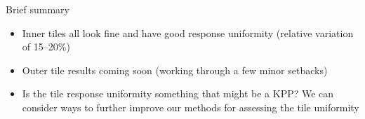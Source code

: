 \documentclass[compress,8pt]{beamer} %
\begin{document}
\iffalse

\begin{frame}
Outer HCal tiles
\end{frame}

\begin{frame}{Outer HCal Tile Scan---945}
\begin{adjustwidth}{-3em}{-3em}
\begin{center}
\texttt{[image: ./Photos/FarEtaOuterHCalScanBrokenFiber.png]}
\end{center}
\end{adjustwidth}
Known bad tile... was this intentional???
\end{frame}

\fi



\begin{frame}{Brief summary}
\begin{itemize}
\item Inner tiles all look fine and have good response uniformity (relative variation of 15--20\%)
\item Outer tile results coming soon (working through a few minor setbacks)
\item Is the tile response uniformity something that might be a KPP?  We can consider ways to further
  improve our methods for assessing the tile uniformity
\end{itemize}
\end{frame}



%
\end{document}

